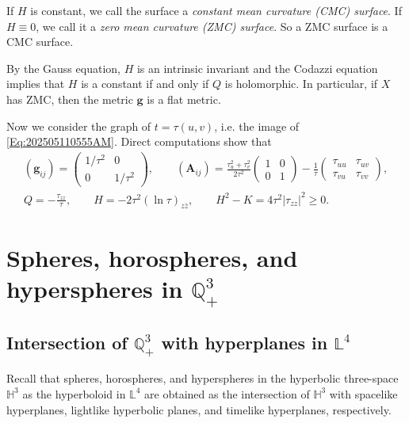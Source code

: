 \documentclass[12pt,reqno]{amsart}
\theoremstyle{plain} %
\theoremstyle{definition}
\numberwithin{equation}{section}
\newcommand{\hthree}{\mathbb{H}^3}
\newcommand{\qthreep}{\mathbb{Q}^3_+}
\newcommand{\lfour}{\mathbb{L}^4}
\begin{document}
If  $H$ is constant, we call the surface a \emph{constant mean curvature (CMC) surface}.
If  $H \equiv 0$, we call it a \emph{zero mean curvature (ZMC) surface}.
So a ZMC surface is a CMC surface.

By the Gauss equation, $H$ is an intrinsic invariant and the Codazzi equation implies that $H$ is a constant if and only if $Q$ is holomorphic. In particular, if $X$ has ZMC, then the metric $\mathbf{g}$ is a flat metric.

Now we consider the graph of $t=\tau(u,v)$, i.e. the image of \eqref{Eq:202505110555AM}.
Direct computations show that
\begin{gather}
	\label{Eq:202601180922AM}
	(\mathbf{g}_{ij}) = \begin{pmatrix} 1/\tau^2 & 0 \\ 0 & 1/\tau^2 \end{pmatrix}, \qquad
	(\mathbf{A}_{ij}) = \frac{\tau_u^2+\tau_v^2}{2\tau^2 } \begin{pmatrix} 1 & 0 \\ 0 & 1 \end{pmatrix}
	-\frac{1}{\tau} \begin{pmatrix} \tau_{uu} & \tau_{uv} \\ \tau_{vu} & \tau_{vv} \end{pmatrix},
	\\
	\label{Eq:202601180923AM}
	Q = - \frac{\tau_{zz} }{\tau}, \qquad
	H = - 2 \tau^2 (\ln \tau)_{z\bar{z}}, \qquad
	H^2-K = 4 \tau^2 |\tau_{zz}|^2 \ge 0.
\end{gather}


\section{Spheres, horospheres, and hyperspheres in $\qthreep$}\label{Spheres}

\subsection{Intersection of $\qthreep$ with hyperplanes in $\mathbb{L}^4$}\label{SubSec:202601151013PM}
Recall that  spheres, horospheres, and hyperspheres in the hyperbolic three-space $\hthree$ as the hyperboloid in $\lfour$  are obtained as the intersection of $\hthree$ with spacelike hyperplanes, lightlike hyperbolic planes, and timelike hyperplanes, respectively.
\end{document}
